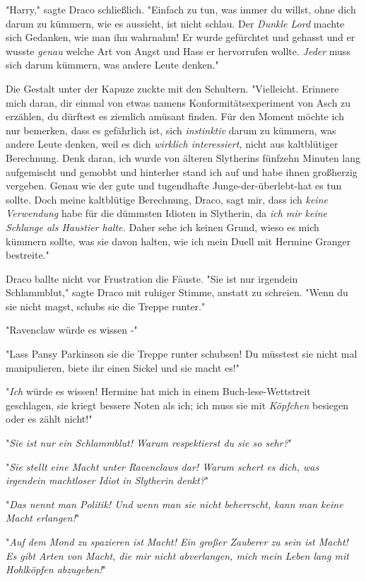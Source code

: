 {"Harry," sagte Draco schließlich. "Einfach zu tun, was immer du willst, ohne dich darum zu kümmern, wie es aussieht, ist nicht schlau. Der \emph{Dunkle Lord} machte sich Gedanken, wie man ihn wahrnahm! Er wurde gefürchtet und gehasst und er wusste \emph{genau} welche Art von Angst und Hass er hervorrufen wollte. \emph{Jeder} muss sich darum kümmern, was andere Leute denken."

Die Gestalt unter der Kapuze zuckte mit den Schultern. "Vielleicht. Erinnere mich daran, dir einmal von etwas namens Konformitätsexperiment von Asch zu erzählen, du dürftest es ziemlich amüsant finden. Für den Moment möchte ich nur bemerken, dass es gefährlich ist, sich \emph{instinktiv} darum zu kümmern, was andere Leute denken, weil es dich \emph{wirklich interessiert,} nicht aus kaltblütiger Berechnung. Denk daran, ich wurde von älteren Slytherins fünfzehn Minuten lang aufgemischt und gemobbt und hinterher stand ich auf und habe ihnen großherzig vergeben. Genau wie der gute und tugendhafte Junge-der-überlebt-hat es tun sollte. Doch meine kaltblütige Berechnung, Draco, sagt mir, dass ich \emph{keine Verwendung} habe für die dümmsten Idioten in Slytherin, da \emph{ich mir keine Schlange als Haustier halte.} Daher sehe ich keinen Grund, wieso es mich kümmern sollte, was sie davon halten, wie ich mein Duell mit Hermine Granger bestreite."

Draco ballte nicht vor Frustration die Fäuste. "Sie ist nur irgendein Schlammblut," sagte Draco mit ruhiger Stimme, anstatt zu schreien. "Wenn du sie nicht magst, schubs sie die Treppe runter."

"Ravenclaw würde es wissen -"

"Lass Pansy Parkinson sie die Treppe runter schubsen! Du müsstest sie nicht mal manipulieren, biete ihr einen Sickel und sie macht es!"

"\emph{Ich} würde es wissen! Hermine hat mich in einem Buch-lese-Wettstreit geschlagen, sie kriegt bessere Noten als ich; ich muss sie mit \emph{Köpfchen} besiegen oder es zählt nicht!"

"\emph{Sie ist nur ein Schlammblut! Warum respektierst du sie so sehr?}"

"\emph{Sie stellt eine Macht unter Ravenclaws dar! Warum schert es dich, was irgendein machtloser Idiot in Slytherin denkt?}"

"\emph{Das nennt man Politik! Und wenn man sie nicht beherrscht, kann man keine Macht erlangen!}"

"\emph{Auf dem Mond zu spazieren ist Macht! Ein großer Zauberer zu sein ist Macht! Es gibt Arten von Macht, die mir nicht abverlangen, mich mein Leben lang mit Hohlköpfen abzugeben!}"

}
